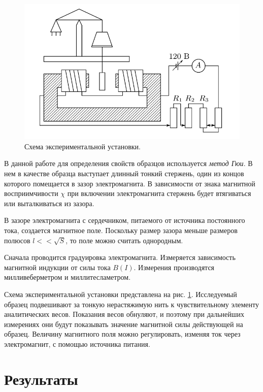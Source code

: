 \documentclass[12pt,a4paper]{article}
\begin{document}
	\begin{figure}
		\vspace{-10pt}
		\includegraphics[width=\linewidth]{res/scheme.png}
		\caption{Схема экспериментальной установки.}
		\label{img:scheme}
	\end{figure}
	
	В данной работе для определения свойств образцов используется \textit{метод Гюи}. В нем в качестве образца выступает длинный тонкий стержень, один из концов которого помещается в зазор электромагнита.
	В зависимости от знака магнитной восприимчивости $\chi$ при включении электромагнита стержень будет втягиваться или выталкиваться из зазора.
	
	В зазоре электромагнита с сердечником, питаемого от источника постоянного тока, создается магнитное поле. Поскольку размер зазора меньше размеров полюсов $l << \sqrt{S}$, то поле можно считать однородным.
	
	Сначала проводится градуировка электромагнита. Измеряется зависимость магнитной индукции от силы тока $B(I)$. Измерения производятся милливеберметром и миллитесламетром.
	
	Схема экспериментальной установки представлена на рис. \ref{img:scheme}. Исследуемый образец подвешивают за тонкую нерастяжимую нить к чувствительному элементу аналитических весов. Показания весов обнуляют, и поэтому при дальнейших измерениях они будут показывать значение магнитной силы действующей на образец. Величину магнитного поля можно регулировать, изменяя ток через электромагнит, с помощью источника питания.
	
	\section*{Результаты}
	
\end{document}
